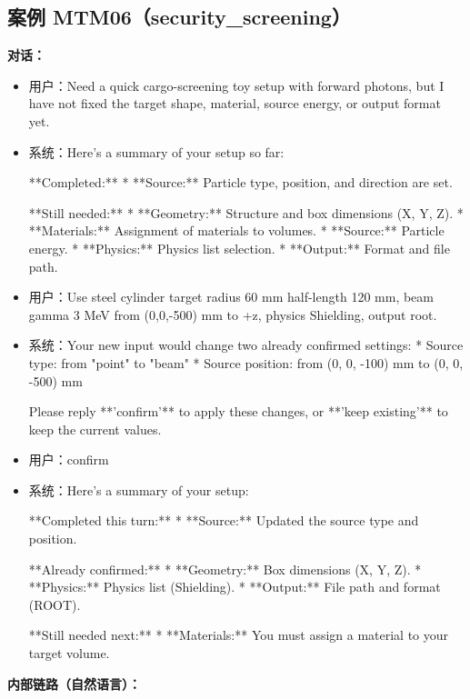 \documentclass[11pt]{ctexart}
\begin{document}
\subsection{案例 MTM06（security\_screening）}
\textbf{对话：}
\begin{itemize}
\item 用户：Need a quick cargo-screening toy setup with forward photons, but I have not fixed the target shape, material, source energy, or output format yet.
\item 系统：Here's a summary of your setup so far:

**Completed:**
*   **Source:** Particle type, position, and direction are set.

**Still needed:**
*   **Geometry:** Structure and box dimensions (X, Y, Z).
*   **Materials:** Assignment of materials to volumes.
*   **Source:** Particle energy.
*   **Physics:** Physics list selection.
*   **Output:** Format and file path.
\item 用户：Use steel cylinder target radius 60 mm half-length 120 mm, beam gamma 3 MeV from (0,0,-500) mm to +z, physics Shielding, output root.
\item 系统：Your new input would change two already confirmed settings:
*   Source type: from "point" to "beam"
*   Source position: from (0, 0, -100) mm to (0, 0, -500) mm

Please reply **'confirm'** to apply these changes, or **'keep existing'** to keep the current values.
\item 用户：confirm
\item 系统：Here's a summary of your setup:

**Completed this turn:**
*   **Source:** Updated the source type and position.

**Already confirmed:**
*   **Geometry:** Box dimensions (X, Y, Z).
*   **Physics:** Physics list (Shielding).
*   **Output:** File path and format (ROOT).

**Still needed next:**
*   **Materials:** You must assign a material to your target volume.
\end{itemize}
\textbf{内部链路（自然语言）：}
\end{document}
